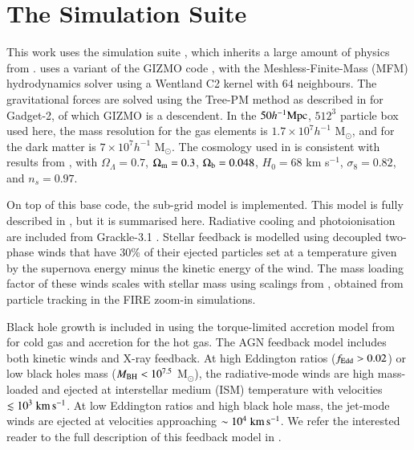 \section{The \simba{} Simulation Suite}
\label{sec:simba}

This work uses the \simba{} simulation suite \citep{Dave2019}, which inherits a
large amount of physics from \mufasa{} \citep{Dave2016}. \simba{} uses a
variant of the GIZMO code \citep{Hopkins2015}, with the Meshless-Finite-Mass
(MFM) hydrodynamics solver using a Wentland C2 kernel with 64 neighbours. The
gravitational forces are solved using the Tree-PM method as described in
\citet{Springel2005b} for Gadget-2, of which GIZMO is a descendent. In the $50 h^{-1}{\rm Mpc}{}$, $512^3$ particle box used here, the mass resolution for the gas elements is $1.7\times10^7h^{-1}$ M$_\odot$, and for the dark matter is $7\times10^7h^{-1}$ M$_\odot$. The cosmology used in \simba{} is consistent with results from
\citet{PlanckCollaboration2016}, with $\Omega_\Lambda = 0.7$, $\Omega_{\rm m} =
0.3$, $\Omega_{\rm b} = 0.048$, $H_0 = 68$ km s$^{-1}$, $\sigma_8=0.82$, and
$n_s=0.97$.

On top of this base code, the \simba{} sub-grid model is implemented. This
model is fully described in \citet{Dave2019}, but it is summarised here.
Radiative cooling and photoionisation are included from Grackle-3.1
\citep{Smith2016}. Stellar feedback is modelled using decoupled two-phase winds
that have 30\% of their ejected particles set at a temperature given by the
supernova energy minus the kinetic energy of the wind. The mass
loading factor of these winds scales with stellar mass using scalings from
\citet{AnglesAlcazar2017}, obtained from particle tracking in the FIRE zoom-in simulations.

Black hole growth is included in \simba{} using the torque-limited
accretion model from \citet{AnglesAlcazar2017b} for cold gas and \citet{Bondi1952}
accretion for the hot gas. The AGN feedback model includes both kinetic winds and X-ray feedback. At high Eddington ratios ($f_{\rm Edd} > 0.02$) or low black holes mass ($M_{\rm BH} < 10^{7.5}$
M$_\odot$), the
radiative-mode winds are high mass-loaded and ejected at interstellar medium (ISM) temperature with velocities $\lesssim 10^3 \;{\rm km}\,{\rm s}^{-1}{}$. At low Eddington ratios and high black hole mass, the jet-mode winds are ejected at velocities approaching $\sim 10^4\;{\rm km}\,{\rm s}^{-1}{}$. We refer the interested reader to the full description of this
feedback model in \citet{Dave2019}.

